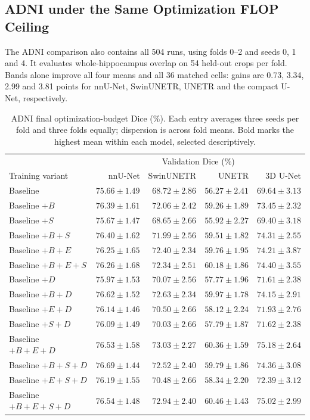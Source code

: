 \documentclass[12pt,a4paper]{article}
\begin{document}
\FloatBarrier
\subsection{ADNI under the Same Optimization FLOP Ceiling}
\label{sec:adni-results}

The ADNI comparison also contains all 504 runs, using folds 0--2 and
seeds 0, 1 and 4. It evaluates whole-hippocampus overlap on 54 held-out
crops per fold. Bands alone improve all four means and all 36 matched
cells: gains are 0.73, 3.34, 2.99 and 3.81 points for nnU-Net,
SwinUNETR, UNETR and the compact U-Net, respectively.
\begin{table}[htbp]
\centering\small{}
\setlength{\tabcolsep}{5pt}
\renewcommand{\arraystretch}{1.15}
\begin{tabular}{@{}lrrrr@{}}
\hline
 & \multicolumn{4}{c}{Validation Dice (\%)} \\
Training variant & nnU-Net & SwinUNETR & UNETR & 3D U-Net \\
\hline
Baseline & $75.66\pm1.49$ & $68.72\pm2.86$ & $56.27\pm2.41$ & $69.64\pm3.13$ \\
Baseline $+B$ & $76.39\pm1.61$ & $72.06\pm2.42$ & $59.26\pm1.89$ & $73.45\pm2.32$ \\
Baseline $+S$ & $75.67\pm1.47$ & $68.65\pm2.66$ & $55.92\pm2.27$ & $69.40\pm3.18$ \\
Baseline $+B+S$ & $76.40\pm1.62$ & $71.99\pm2.56$ & $59.51\pm1.82$ & $74.31\pm2.55$ \\
Baseline $+B+E$ & $76.25\pm1.65$ & $72.40\pm2.34$ & $59.76\pm1.95$ & $74.21\pm3.87$ \\
Baseline $+B+E+S$ & $76.26\pm1.68$ & $72.34\pm2.51$ & $60.18\pm1.86$ & $74.40\pm3.55$ \\
Baseline $+D$ & $75.97\pm1.53$ & $70.07\pm2.56$ & $57.77\pm1.96$ & $71.61\pm2.38$ \\
Baseline $+B+D$ & $76.62\pm1.52$ & $72.63\pm2.34$ & $59.97\pm1.78$ & $74.15\pm2.91$ \\
Baseline $+E+D$ & $76.14\pm1.46$ & $70.50\pm2.66$ & $58.12\pm2.24$ & $71.93\pm2.76$ \\
Baseline $+S+D$ & $76.09\pm1.49$ & $70.03\pm2.66$ & $57.79\pm1.87$ & $71.62\pm2.38$ \\
Baseline $+B+E+D$ & $76.53\pm1.58$ & $\mathbf{73.03\pm2.27}$ & $60.36\pm1.59$ & $\mathbf{75.18\pm2.64}$ \\
Baseline $+B+S+D$ & $\mathbf{76.69\pm1.44}$ & $72.52\pm2.40$ & $59.79\pm1.86$ & $74.36\pm3.08$ \\
Baseline $+E+S+D$ & $76.19\pm1.55$ & $70.48\pm2.66$ & $58.34\pm2.20$ & $72.39\pm3.12$ \\
Baseline $+B+E+S+D$ & $76.54\pm1.48$ & $72.94\pm2.40$ & $\mathbf{60.46\pm1.43}$ & $75.02\pm2.99$ \\
\hline
\end{tabular}
\caption{ADNI final optimization-budget Dice (\%). Each entry averages three seeds per fold and three folds equally; dispersion is across fold means. Bold marks the highest mean within each model, selected descriptively.}
\label{tab:adni-noaug-matrix}
\end{table}
\end{document}
